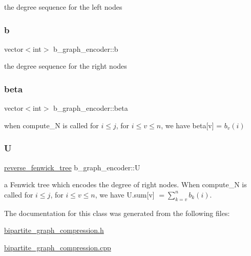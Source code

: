 the degree sequence for the left nodes 

\mbox{\label{classb__graph__encoder_a767826e268702e45ab71565e096a52b8}} 
\subsubsection{\texorpdfstring{b}{b}}
{\footnotesize\ttfamily vector$<$int$>$ b\+\_\+graph\+\_\+encoder\+::b\hspace{0.3cm}{\ttfamily [private]}}



the degree sequence for the right nodes 

\mbox{\label{classb__graph__encoder_ae54d76cc4cee399d98951f870897a144}} 
\subsubsection{\texorpdfstring{beta}{beta}}
{\footnotesize\ttfamily vector$<$int$>$ b\+\_\+graph\+\_\+encoder\+::beta\hspace{0.3cm}{\ttfamily [private]}}



when compute\+\_\+N is called for $i \leq j$, for $ i \leq v \leq n$, we have beta\mbox{[}v\mbox{]} = $b_v(i)$ 

\mbox{\label{classb__graph__encoder_ac810138443002a2b2cf579ced2dc34ce}} 
\subsubsection{\texorpdfstring{U}{U}}
{\footnotesize\ttfamily \hyperlink{classreverse__fenwick__tree}{reverse\+\_\+fenwick\+\_\+tree} b\+\_\+graph\+\_\+encoder\+::U\hspace{0.3cm}{\ttfamily [private]}}



a Fenwick tree which encodes the degree of right nodes. When compute\+\_\+N is called for $i \leq j$, for $i \leq v \leq n$, we have U.\+sum\mbox{[}v\mbox{]} $= \sum_{k = v}^n b_k(i)$. 



The documentation for this class was generated from the following files\+:\begin{DoxyCompactItemize}
\item 
\hyperlink{bipartite__graph__compression_8h}{bipartite\+\_\+graph\+\_\+compression.\+h}\item 
\hyperlink{bipartite__graph__compression_8cpp}{bipartite\+\_\+graph\+\_\+compression.\+cpp}\end{DoxyCompactItemize}
